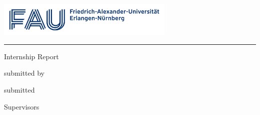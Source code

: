 \begin{titlepage}
\begin{localsize}{11}
\begin{center}
\begin{center}
\vspace*{0.2cm}

\includegraphics[width=8.5cm]{figures/logos/Logo_FAU.pdf}
\end{center}
\vspace{-0.3cm}
\noindent\rule{\textwidth}{1pt}

\vspace{1cm}
{{\Large Internship Report}}

\vspace{1cm}
{\myTitle}

\vspace{0.5cm}
{\small{submitted by}\\
\vspace{0.2cm}
\Large{\myName}}

\vspace{0.5cm}
{\small{submitted}\\
\vspace{0.2cm}
\Large{\myTime}

\vspace{3.5cm}}

\vspace{0.5cm}
{\small Supervisors}\\
\vspace{0.2cm}
{\Large \mySupervisor\\
\vspace{0.15cm}
\myProf}
\end{center}

\vspace{2cm}


\end{localsize}
\end{titlepage}
